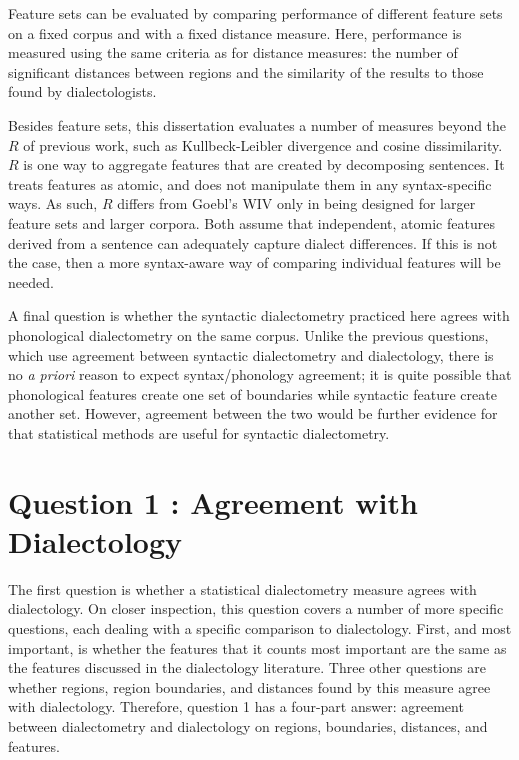 Feature sets can be evaluated by comparing performance of different
feature sets on a fixed corpus and with a fixed distance
measure. Here, performance is measured using the same criteria as for
distance measures: the number of significant distances between regions
and the similarity of the results to those found by dialectologists.

Besides feature sets, this dissertation evaluates a number of measures
beyond the $R$ of previous work, such as Kullbeck-Leibler divergence
and cosine dissimilarity. $R$ is one way to aggregate features that
are created by decomposing sentences. It treats features as atomic,
and does not manipulate them in any syntax-specific ways. As such, $R$
differs from Goebl's WIV only in being designed for larger feature
sets and larger corpora. Both assume that independent, atomic features
derived from a sentence can adequately capture dialect differences. If
this is not the case, then a more syntax-aware way of comparing
individual features will be needed.

A final question is whether the syntactic dialectometry practiced here
agrees with phonological dialectometry on the same corpus. Unlike the
previous questions, which use agreement between syntactic
dialectometry and dialectology, there is no {\it a priori} reason to
expect syntax/phonology agreement; it is quite possible that
phonological features create one set of boundaries while syntactic
feature create another set. However, agreement between the two would
be further evidence for that statistical methods are useful for
syntactic dialectometry.

\section{Question 1 : Agreement with Dialectology}

The first question is whether a statistical dialectometry measure
agrees with dialectology. On closer inspection, this question covers a
number of more specific questions, each dealing with a specific
comparison to dialectology. First, and most important, is whether the features that
it counts most important are the same as the features discussed in the
dialectology literature. Three other questions are whether
regions, region boundaries, and distances found by this measure agree with
dialectology. Therefore, question 1 has a four-part
answer: agreement between dialectometry and dialectology on regions,
boundaries, distances, and features.

